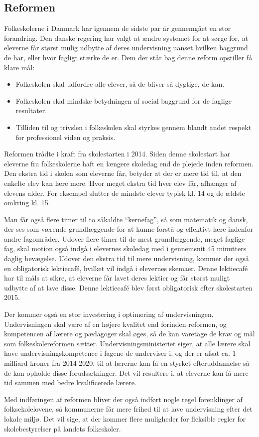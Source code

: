 \subsection{Reformen}
\label{Reformen}
Folkeskolerne i Danmark har igennem de sidste par år gennemgået en stor forandring. Den danske regering har valgt at ændre systemet for at sørge for, at eleverne får størst mulig udbytte af deres undervisning uanset hvilken baggrund de har, eller hvor fagligt stærke de er.
Dem der står bag denne reform opstiller få klare mål\cite{reformenMaal}:
	\begin{itemize}
		\item Folkeskolen skal udfordre alle elever, så de bliver så dygtige, de kan.
		\item Folkeskolen skal mindske betydningen af social baggrund for de faglige resultater.
		\item Tilliden til og trivslen i folkeskolen skal styrkes gennem blandt andet respekt for professionel viden og praksis.
	\end{itemize}

Reformen trådte i kraft fra skolestarten i 2014. Siden denne skolestart har eleverne fra folkeskolerne haft en længere skoledag end de plejede inden reformen. Den ekstra tid i skolen som eleverne får, betyder at der er mere tid til, at den enkelte elev kan lære mere. Hvor meget ekstra tid hver elev får, afhænger af elevens alder. For eksempel slutter de mindste elever typisk kl. 14 og de ældste omkring kl. 15.

Man får også flere timer til to såkaldte ``kernefag”, så som matematik og dansk, der ses som værende grundlæggende for at kunne forstå og effektivt lære indenfor andre fagområder. Udover flere timer til de mest grundlæggende, meget faglige fag, skal motion også indgå i elevernes skoledag med i gennemsnit 45 minutters daglig bevægelse\cite{reformenBorger}. Udover den ekstra tid til mere undervisning, kommer der også en obligatorisk lektiecafé, hvilket vil indgå i elevernes skemaer. Denne lektiecafé har til måls at sikre, at eleverne får lavet deres lektier og får størst muligt udbytte af at lave disse. Denne lektiecafé blev først obligatorisk efter skolestarten 2015\cite{Lektiecafe}.

Der kommer også en stor investering i optimering af undervisningen. Undervisningen skal være af en højere kvalitet end forinden reformen, og kompetencen af lærere og pædagoger skal øges, så de kan varetage de krav og mål som folkeskolereformen sætter. Undervisningsministeriet siger, at alle lærere skal have undervisningskompetence i fagene de underviser i, og der er afsat ca. 1 milliard kroner fra 2014-2020, til at lærerne kan få en styrket efteruddannelse så de kan opholde disse forudsætninger. Det vil resultere i, at eleverne kan få mere tid sammen med bedre kvalificerede lærere.

Med indføringen af reformen bliver der også indført nogle regel forenklinger af folksekolelovene, så kommunerne får mere frihed til at lave undervisning efter det lokale miljø. Det vil sige, at der kommer flere muligheder for fleksible regler for skolebestyrelser på landets folkeskoler.
